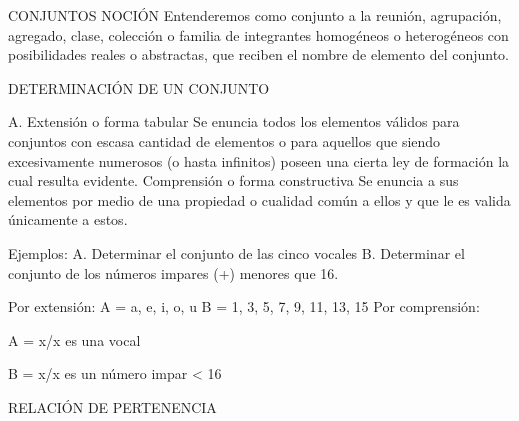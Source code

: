 CONJUNTOS
NOCIÓN
Entenderemos como conjunto a la reunión,
agrupación, agregado, clase, colección o
familia de integrantes homogéneos o
heterogéneos con posibilidades reales o
abstractas, que reciben el nombre de elemento del conjunto.

DETERMINACIÓN DE UN CONJUNTO

A. Extensión o forma tabular
Se enuncia todos los elementos válidos
para conjuntos con escasa cantidad de
elementos o para aquellos que siendo
excesivamente
numerosos
(o
hasta
infinitos) poseen una cierta ley de
formación la cual resulta evidente.
Comprensión o forma constructiva
Se enuncia a sus elementos por medio
de una propiedad o cualidad común a
ellos y que le es valida únicamente a
estos.


Ejemplos:
A.
Determinar el conjunto de las cinco
vocales
B.
Determinar
el
conjunto
de
los
números impares (+) menores que
16.

Por extensión:
A = {a, e, i, o, u}
B = {1, 3, 5, 7, 9, 11, 13, 15}
Por comprensión:

A = {x/x es una vocal}

B = {x/x es un número impar < 16}

RELACIÓN DE PERTENENCIA